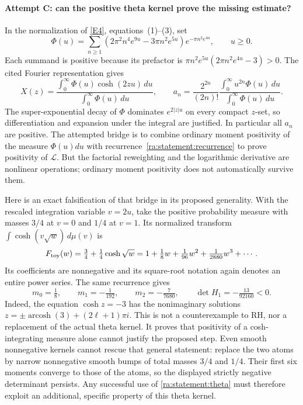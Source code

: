 \documentclass[11pt]{article}
\newcommand{\eref}[2]{\hyperlink{extra:#1:#2}{[E#2]}}
\begin{document}
\paragraph{Attempt C: can the positive theta kernel prove the missing estimate?}
In the normalization of \eref{statement}{4}, equations~(1)--(3), set
\[
 \Phi(u)=\sum_{n\ge1}
 (2\pi^2n^4e^{9u}-3\pi n^2e^{5u})e^{-\pi n^2e^{4u}},\qquad u\ge0.
\]
Each summand is positive because its prefactor is
$\pi n^2e^{5u}(2\pi n^2e^{4u}-3)>0$. The cited Fourier representation gives
\begin{equation}\label{ra:statement:theta}
 X(z)=\frac{\int_0^\infty\Phi(u)\cosh(2zu)\,du}
            {\int_0^\infty\Phi(u)\,du},\qquad
 a_n=\frac{2^{2n}}{(2n)!}
      \frac{\int_0^\infty u^{2n}\Phi(u)\,du}
           {\int_0^\infty\Phi(u)\,du}.
\end{equation}
The super-exponential decay of $\Phi$ dominates
$e^{2|z|u}$ on every compact $z$-set, so differentiation and expansion under
the integral are justified. In particular all $a_n$ are positive.
The attempted bridge is to combine ordinary moment positivity of the measure
$\Phi(u)du$ with recurrence~\eqref{ra:statement:recurrence} to prove positivity of
$\mathcal L$. But the factorial reweighting and the logarithmic derivative
are nonlinear operations; ordinary moment positivity does not automatically
survive them.

Here is an exact falsification of that bridge in its proposed generality.
With the rescaled integration variable $v=2u$, take the positive probability
measure with masses $3/4$ at $v=0$ and $1/4$ at $v=1$. Its normalized transform
$\int\cosh(v\sqrt w)\,d\mu(v)$ is
\[
 F_{\rm toy}(w)=\tfrac34+\tfrac14\cosh\sqrt w
     =1+\tfrac18w+\tfrac1{96}w^2+\tfrac1{2880}w^3+\cdots.
\]
Its coefficients are nonnegative and its square-root notation again denotes
an entire power series. The same recurrence gives
\[
 m_0=\tfrac18,\qquad m_1=-\tfrac1{192},\qquad
 m_2=-\tfrac7{7680},\qquad
 \det H_1=-\tfrac{13}{92160}<0.
\]
Indeed, the equation $\cosh z=-3$ has the nonimaginary solutions
$z=\pm\operatorname{arcosh}(3)+(2\ell+1)\pi i$.
This is not a counterexample to RH, nor a replacement of the actual theta
kernel. It proves that positivity of a cosh-integrating measure alone cannot
justify the proposed step. Even smooth nonnegative kernels cannot rescue
that general statement: replace the two atoms by narrow nonnegative smooth
bumps of total masses $3/4$ and $1/4$. Their first six moments converge to
those of the atoms, so the displayed strictly negative determinant persists.
Any successful use of \eqref{ra:statement:theta} must therefore exploit an additional,
specific property of this theta kernel.
\end{document}
